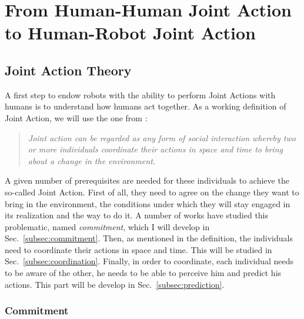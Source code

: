 \documentclass[english,a4paper,11pt,twoside]{StyleThese}
\begin{document}
\setcounter{chapter}{0} %
\dominitoc
\faketableofcontents
\fi

\chapter{From Human-Human Joint Action to Human-Robot Joint Action}
\minitoc

\section{Joint Action Theory}

A first step to endow robots with the ability to perform Joint Actions with humans is to understand how humans act together. As a working definition of Joint Action, we will use the one from \cite{sebanz2006joint}:

\begin{quote}
\textit{Joint action can be regarded as any form of social interaction whereby two or more individuals coordinate their actions in space and time to bring about a change in the environment.}
\end{quote}

A given number of prerequisites are needed for these individuals to achieve the so-called Joint Action. First of all, they need to agree on the change they want to bring in the environment, the conditions under which they will stay engaged in its realization and the way to do it. A number of works have studied this problematic, named \textit{commitment}, which I will develop in Sec.~\ref{subsec:commitment}. Then, as mentioned in the definition, the individuals need to coordinate their actions in space and time. This will be studied in Sec.~\ref{subsec:coordination}. Finally, in order to coordinate, each individual needs to be aware of the other, he needs to be able to perceive him and predict his actions. This part will be develop in Sec.~\ref{subsec:prediction}.

\subsection{Commitment}
\end{document}
